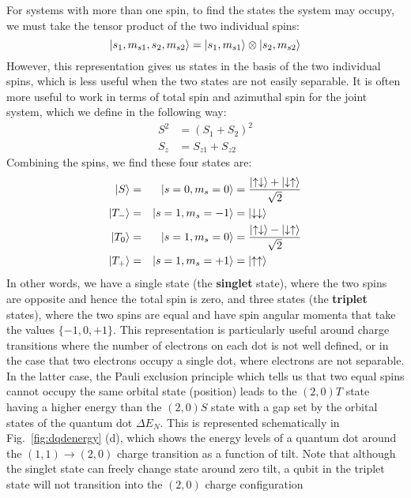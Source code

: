 For systems with more than one spin, to find the states the system may occupy, we must take the
tensor product of the two individual spins:
\begin{equation}
  \ket{s_1, m_{s1}, s_2, m_{s2}} = \ket{s_1, m_{s1}} \otimes \ket{s_2, m_{s2}}
\end{equation}
However, this representation gives us states in the basis of the two individual spins, which is less useful
when the two states are not easily separable. It is often more useful to work in terms of total spin and
azimuthal spin for the joint system, which we define in the following way:
\begin{eqnarray}
  S^2 &= (S_1 + S_2)^2 \\
  S_z &= S_{z1} + S_{z2}
\end{eqnarray}
Combining the spins, we find these four states are:
\begin{alignat}{2}
  \ket{S} &=&   \ket{s = 0, m_s = 0} &= \frac{\ket{\uparrow\downarrow} + \ket{\downarrow\uparrow}}{\sqrt{2}} \\
  \ket{T_-} &=& \ket{s = 1, m_s = -1} &= \ket{\downarrow\downarrow} \\
  \ket{T_0} &=& \ket{s = 1, m_s = 0} &= \frac{\ket{\uparrow\downarrow} - \ket{\downarrow\uparrow}}{\sqrt{2}} \\
  \ket{T_+} &=& \ket{s = 1, m_s = +1} &= \ket{\uparrow\uparrow}
\end{alignat}
In other words, we have a single state (the \textbf{singlet} state), where the two spins are opposite and hence
the total spin is zero, and three states (the \textbf{triplet} states), where the two spins are equal and have
spin angular momenta that take the values $\{-1, 0, +1\}$. This representation is particularly useful around
charge transitions where the number of electrons on each dot is not well defined, or in the case that two electrons
occupy a single dot, where electrons are not separable. In the latter case, the Pauli exclusion principle which tells
us that two equal spins cannot occupy the same orbital state (position) leads to the $(2, 0)T$ state having a higher
energy than the $(2, 0)S$ state with a gap set by the orbital states of the quantum dot $\Delta E_N$. This is
represented schematically in Fig.~\ref{fig:dqdenergy} (d), which shows the energy levels of a quantum dot around the
$(1, 1) \rightarrow (2, 0)$ charge transition as a function of tilt. Note that although the singlet state can freely
change state around zero tilt, a qubit in the triplet state will not transition into the $(2, 0)$ charge configuration
